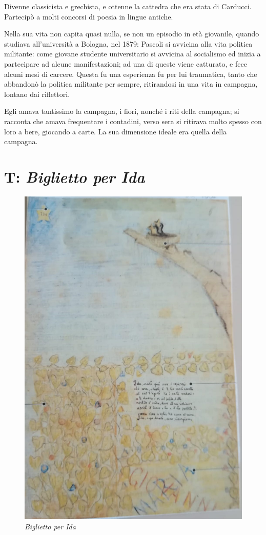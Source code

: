 \documentclass[a4paper, twoside, titlepage]{book}
\begin{document}
Divenne classicista e grechista, e ottenne la cattedra che era stata di Carducci. Partecipò a molti concorsi di poesia in lingue antiche.

Nella sua vita non capita quasi nulla, se non un episodio in età giovanile, quando studiava all'università a Bologna, nel 1879: Pascoli si avvicina alla vita politica militante: come giovane studente universitario si avvicina al socialismo ed inizia a partecipare ad alcune manifestazioni; ad una di queste viene catturato, e fece alcuni mesi di carcere. Questa fu una esperienza fu per lui traumatica, tanto che abbandonò la politica militante per sempre, ritirandosi in una vita in campagna, lontano dai riflettori.

Egli amava tantissimo la campagna, i fiori, nonché i riti della campagna; si racconta che amava frequentare i contadini, verso sera si ritirava molto spesso con loro a bere, giocando a carte. La sua dimensione ideale era quella della campagna.


\section{T: \textit{Biglietto per Ida}}

\begin{figure}
\includegraphics[width=\textwidth]{1}
\caption{\textit{Biglietto per Ida}}
\end{figure}
\end{document}

